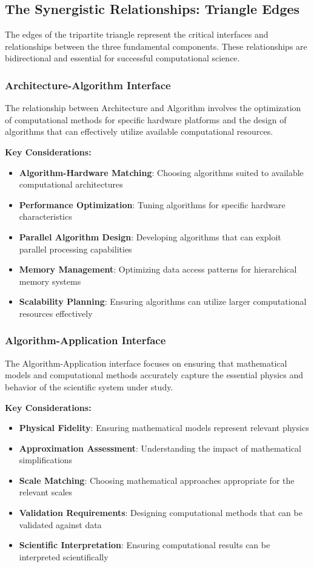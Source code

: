 \subsection{The Synergistic Relationships: Triangle Edges}

The edges of the tripartite triangle represent the critical interfaces and relationships between the three fundamental components. These relationships are bidirectional and essential for successful computational science.

\subsubsection{Architecture-Algorithm Interface}

The relationship between Architecture and Algorithm involves the optimization of computational methods for specific hardware platforms and the design of algorithms that can effectively utilize available computational resources.

\textbf{Key Considerations:}
\begin{itemize}
    \item \textbf{Algorithm-Hardware Matching}: Choosing algorithms suited to available computational architectures
    \item \textbf{Performance Optimization}: Tuning algorithms for specific hardware characteristics
    \item \textbf{Parallel Algorithm Design}: Developing algorithms that can exploit parallel processing capabilities
    \item \textbf{Memory Management}: Optimizing data access patterns for hierarchical memory systems
    \item \textbf{Scalability Planning}: Ensuring algorithms can utilize larger computational resources effectively
\end{itemize}

\subsubsection{Algorithm-Application Interface}

The Algorithm-Application interface focuses on ensuring that mathematical models and computational methods accurately capture the essential physics and behavior of the scientific system under study.

\textbf{Key Considerations:}
\begin{itemize}
    \item \textbf{Physical Fidelity}: Ensuring mathematical models represent relevant physics
    \item \textbf{Approximation Assessment}: Understanding the impact of mathematical simplifications
    \item \textbf{Scale Matching}: Choosing mathematical approaches appropriate for the relevant scales
    \item \textbf{Validation Requirements}: Designing computational methods that can be validated against data
    \item \textbf{Scientific Interpretation}: Ensuring computational results can be interpreted scientifically
\end{itemize}

